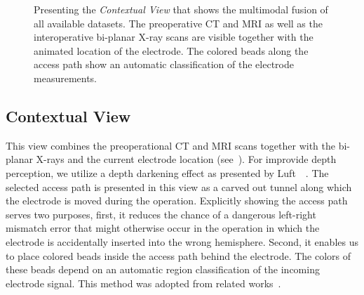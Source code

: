 \begin{figure}
\begin{subfigure}[b]{0.49\textwidth}
\end{subfigure}
\caption{Presenting the \emph{Contextual View} that shows the multimodal fusion of all available datasets. The preoperative CT and MRI as well as the interoperative bi-planar X-ray scans are visible together with the animated location of the electrode. The colored beads along the access path show an automatic classification of the electrode measurements.}
\label{contributions:medbio:dbs:contextual}
\end{figure}

\subsection{Contextual View} \label{contributions:dbs:contextual}
This  view combines the preoperational CT and MRI scans together with the bi-planar X-rays and the current electrode location (see~). For improvide depth perception, we utilize a depth darkening effect as presented by Luft~\etal~\cite{luft2006image}. The selected access path is presented in this view as a carved out tunnel along which the electrode is moved during the operation. Explicitly showing the access path serves two purposes, first, it reduces the chance of a dangerous left-right mismatch error that might otherwise occur in the operation in which the electrode is accidentally inserted into the wrong hemisphere. Second, it enables us to place colored beads inside the access path behind the electrode. The colors of these beads depend on an automatic region classification of the incoming electrode signal. This method was adopted from related works~\cite{dhaese2005computer, miocinovic2007stereotactic}.

